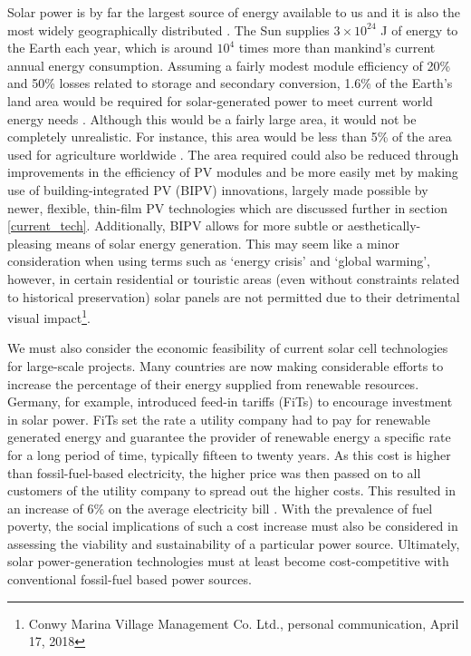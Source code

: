 \documentclass[11pt, twoside]{report}
\begin{document}
Solar power is by far the largest source of energy available to us and it is also the most widely geographically distributed \cite{inorg_pv}. The Sun supplies $3 \times 10^{24}$ J of energy to the Earth each year, which is around $10^4$ times more than mankind's current annual energy consumption. 
Assuming a fairly modest module efficiency of 20\% and 50\% losses related to storage and secondary conversion, 1.6\% of the Earth’s land area would be required for solar-generated power to meet current world energy needs \cite{newPVrev}. Although this would be a fairly large area, it would not be completely unrealistic. For instance, this area would be less than 5\% of the area used for agriculture worldwide \cite{newPVrev}. The area required could also be reduced through improvements in the efficiency of PV modules and be more easily met by making use of building-integrated PV (BIPV) innovations, largely made possible by newer, flexible, thin-film PV technologies which are discussed further in section \ref{current_tech}.
Additionally, BIPV allows for more subtle or aesthetically-pleasing means of solar energy generation. This may seem like a minor consideration when using terms such as `energy crisis' and `global warming', however, in certain residential or touristic areas (even without constraints related to historical preservation) solar panels are not permitted due to their detrimental visual impact\footnote{Conwy Marina Village Management Co. Ltd., personal communication, April 17, 2018}.

We must also consider the economic feasibility of current solar cell technologies for large-scale projects.
Many countries are now making considerable efforts to increase the percentage of their energy supplied from renewable resources. Germany, for example, introduced feed-in tariffs (FiTs) to encourage investment in solar power.
FiTs set the rate a utility company had to pay for renewable generated energy and guarantee the provider of renewable energy a specific rate for a long period of time, typically fifteen to twenty years. As this cost is higher than fossil-fuel-based electricity, the higher price was then passed on to all customers of the utility company to spread out the higher costs. This resulted in an increase of 6\% on the average electricity bill \cite{Germany_Oregon}. With the prevalence of fuel poverty, the social implications of such a cost increase must also be considered in assessing the viability and sustainability of a particular power source.
Ultimately, solar power-generation technologies must at least become cost-competitive with conventional fossil-fuel based power sources.
\end{document}
